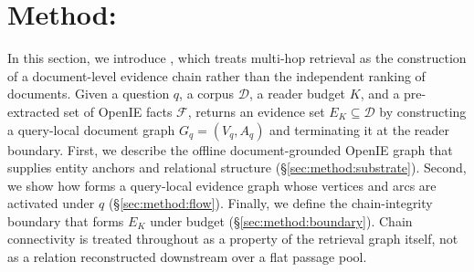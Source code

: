 %
%
%
%

\section{Method: \methodname{}}
\label{sec:method}

In this section, we introduce \methodname{}, which treats multi-hop retrieval
as the construction of a document-level evidence chain rather than the
independent ranking of documents. Given a question $q$, a corpus
$\mathcal{D}$, a reader budget $K$, and a pre-extracted set of OpenIE facts
$\mathcal{F}$, \methodname{} returns an evidence set
$E_K \subseteq \mathcal{D}$ by constructing a query-local document graph
$G_q=(V_q,A_q)$ and terminating it at the reader boundary. First, we describe
the offline document-grounded OpenIE graph that supplies entity anchors and
relational structure (\S\ref{sec:method:substrate}). Second, we show how
\methodname{} forms a
query-local evidence graph whose vertices and arcs are activated under $q$
(\S\ref{sec:method:flow}). Finally, we define the chain-integrity boundary
that forms $E_K$ under budget (\S\ref{sec:method:boundary}). Chain
connectivity is treated throughout as a property of the retrieval graph
itself, not as a relation reconstructed downstream over a flat passage pool.

